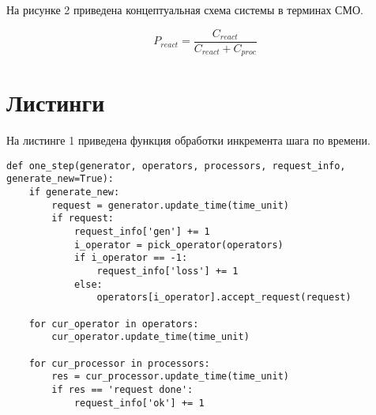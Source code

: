 На рисунке 2 приведена концептуальная схема системы в терминах СМО.

$$
P_{react} = \frac{C_{react}}{C_{react} + C_{proc}}
$$



\section*{Листинги}



На листинге 1 приведена функция обработки инкремента шага по времени.
\begin{lstlisting}[label=CodeStand,caption=Обработка инкремента шага по времени]
def one_step(generator, operators, processors, request_info, generate_new=True):
	if generate_new:
		request = generator.update_time(time_unit)
		if request:
			request_info['gen'] += 1
			i_operator = pick_operator(operators)
			if i_operator == -1:
				request_info['loss'] += 1
			else:
				operators[i_operator].accept_request(request)
	
	for cur_operator in operators:
		cur_operator.update_time(time_unit)
	
	for cur_processor in processors:
		res = cur_processor.update_time(time_unit)
		if res == 'request done':
			request_info['ok'] += 1
\end{lstlisting}


